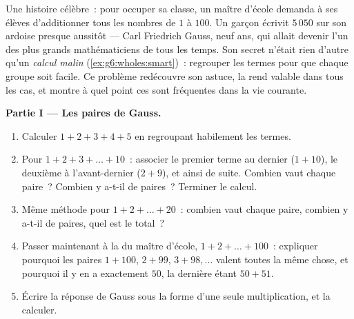\begin{problem}
\label{pb:g6:wholes:1}
Une histoire célèbre~: pour occuper sa classe, un maître d'école
demanda à ses élèves d'additionner tous les nombres de $1$ à $100$.
Un garçon écrivit $5\,050$ sur son ardoise presque aussitôt --- Carl
Friedrich Gauss, neuf ans, qui allait devenir l'un des plus grands
mathématiciens de tous les temps. Son secret n'était rien d'autre
qu'un \emph{calcul malin} (\cref{ex:g6:wholes:smart})~: regrouper les
termes pour que chaque groupe soit facile. Ce problème redécouvre son
astuce, la rend valable dans tous les cas, et montre à quel point ces
 sont fréquentes dans la vie courante.

\medskip
\noindent\textbf{Partie I --- Les paires de Gauss.}
\begin{enumerate}
  \item Calculer $1 + 2 + 3 + 4 + 5$ en regroupant habilement les
        termes.
  \item Pour $1 + 2 + 3 + \dots + 10$~: associer le premier terme au
        dernier ($1 + 10$), le deuxième à l'avant-dernier ($2 + 9$),
        et ainsi de suite. Combien vaut chaque paire~? Combien y
        a-t-il de paires~? Terminer le calcul.
  \item Même méthode pour $1 + 2 + \dots + 20$~: combien vaut chaque
        paire, combien y a-t-il de paires, quel est le total~?
  \item Passer maintenant à la  du maître d'école,
        $1 + 2 + \dots + 100$~: expliquer pourquoi les paires
        $1 + 100$, $2 + 99$, $3 + 98, \dots$ valent toutes la même
        chose, et pourquoi il y en a exactement $50$, la dernière
        étant $50 + 51$.
  \item Écrire la réponse de Gauss sous la forme d'une seule
        multiplication, et la calculer.
\end{enumerate}


\end{problem}
